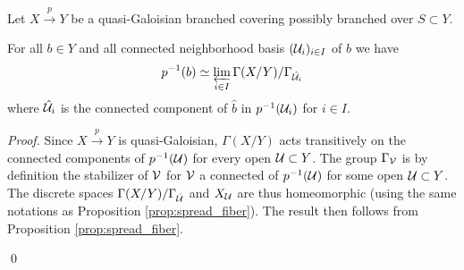 \begin{prop}\label{prop:Galoisian_fiber}
  Let $X\xrightarrow{p} Y$ be a quasi-Galoisian branched covering possibly branched over $S\subset Y$.
  
  For all $b\in Y$ and all connected neighborhood basis $(\mathcal{U}_i)_{i\in I}$ of $b$ we have 
  $$ p^{-1}(b) \simeq \varprojlim_{i\in I} \Gamma(X/Y)/\Gamma_{\hat{\mathcal{U}}_i} $$
  where $\hat{\mathcal{U}}_i$ is the connected component of $\hat b$ in $p^{-1}(\mathcal{U}_i)$ for $i\in I$.
  
\end{prop}

\begin{proof}
  Since $X\xrightarrow{p} Y$ is quasi-Galoisian, $\Gamma(X/Y)$ acts transitively on the connected components of $p^{-1}(\mathcal{U})$ for every open $\mathcal{U}\subset Y$. The group $\Gamma_\mathcal V$ is by definition the stabilizer of $\mathcal V$ for $\mathcal V$ a connected of $p^{-1}(\mathcal{U})$  for some open $\mathcal{U}\subset Y$. The discrete spaces $\Gamma(X/Y)/\Gamma_{\hat{\mathcal{U}}}$ and $X_{\mathcal{U}}$ are thus homeomorphic (using the same notations as Proposition \ref{prop:spread_fiber}). The result then follows from Proposition \ref{prop:spread_fiber}.

  \qed\end{proof}


